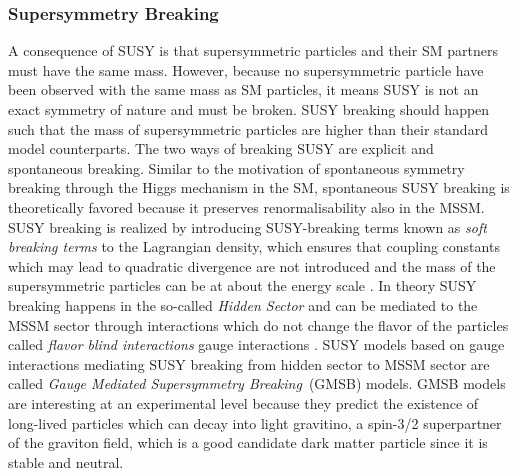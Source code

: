 \subsubsection{Supersymmetry Breaking}
A consequence of SUSY is that supersymmetric particles and their SM partners must have the same mass. However, because no supersymmetric particle have been observed with the same mass as SM particles, it means SUSY is not an exact symmetry of nature and must be broken. SUSY breaking should happen such that the mass of supersymmetric particles are higher than their standard model counterparts. 
 The two ways of breaking SUSY are explicit and spontaneous breaking.
Similar to the motivation of spontaneous symmetry breaking through the Higgs mechanism in the SM, spontaneous SUSY breaking is theoretically favored because it preserves renormalisability also in the MSSM. SUSY breaking is realized by introducing SUSY-breaking terms known as \textit{soft breaking terms} to the Lagrangian density, which ensures that coupling constants which may lead to quadratic divergence are not introduced and the mass of the supersymmetric particles can be at about the \TeV energy scale \cite{SUSYN, SUSYBOOK, SUSY}.
In theory SUSY breaking happens in the so-called \textit{Hidden Sector} and can be mediated to the MSSM sector through interactions which do not change the flavor of the particles called \textit{flavor blind interactions} \eg gauge interactions \cite{SUSYBOOK,GMSB}.
SUSY models based on gauge interactions mediating SUSY breaking from hidden sector to MSSM sector are called \textit{Gauge Mediated Supersymmetry Breaking}~(GMSB) models. GMSB models are interesting at an experimental level because they predict the existence of long-lived particles which can decay into light gravitino, a spin-3/2 superpartner of the graviton field, which is a good candidate dark matter particle since it is stable and neutral.
